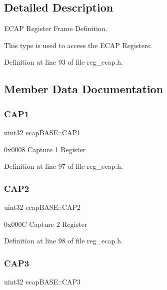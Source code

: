 \subsection{Detailed Description}
E\+C\+AP Register Frame Definition. 

This type is used to access the E\+C\+AP Registers. 

Definition at line 93 of file reg\+\_\+ecap.\+h.



\subsection{Member Data Documentation}
\mbox{\label{structecapBASE_a92fe25ec478d4b189b5aad15d1e97db4}} 
\subsubsection{\texorpdfstring{C\+A\+P1}{CAP1}}
{\footnotesize\ttfamily uint32 ecap\+B\+A\+S\+E\+::\+C\+A\+P1}

0x0008 Capture 1 Register 

Definition at line 97 of file reg\+\_\+ecap.\+h.

\mbox{\label{structecapBASE_a69977a6ca4d32465b98d7c88dfc69c52}} 
\subsubsection{\texorpdfstring{C\+A\+P2}{CAP2}}
{\footnotesize\ttfamily uint32 ecap\+B\+A\+S\+E\+::\+C\+A\+P2}

0x000C Capture 2 Register 

Definition at line 98 of file reg\+\_\+ecap.\+h.

\mbox{\label{structecapBASE_a0e5c07b96ba29809c82e6f5e2473766b}} 
\subsubsection{\texorpdfstring{C\+A\+P3}{CAP3}}
{\footnotesize\ttfamily uint32 ecap\+B\+A\+S\+E\+::\+C\+A\+P3}

